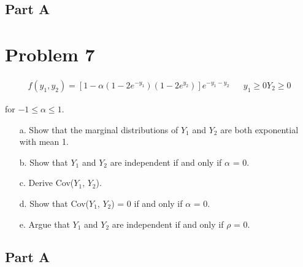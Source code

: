 \documentclass{article}
\begin{document}
\subsection*{Part A}

\section*{Problem 7}
\begin{align*}
f(y_1,y_2) = [1-\alpha{}(1-2e^{-y_1})(1-2e^{y_2})]e^{-y_1-y_2} && y_1\geq 0 Y_2\geq 0
\end{align*}


for $-1 \leq \alpha \leq 1$.
\begin{enumerate}

\item[a.] Show that the marginal distributions of $Y_1$ and $Y_2$ are both exponential with mean 1.
\item[b.] Show that $Y_1$ and $Y_2$ are independent if and only if $\alpha$ = 0.
\item[c.] Derive Cov($Y_1$, $Y_2$).
\item[d.] Show that Cov($Y_1$, $Y_2$) = 0 if and only if $\alpha$ = 0.
\item[e.] Argue that $Y_1$ and $Y_2$ are independent if and only if $\rho$ = 0.
\end{enumerate}
\subsection*{Part A}
\end{document}
